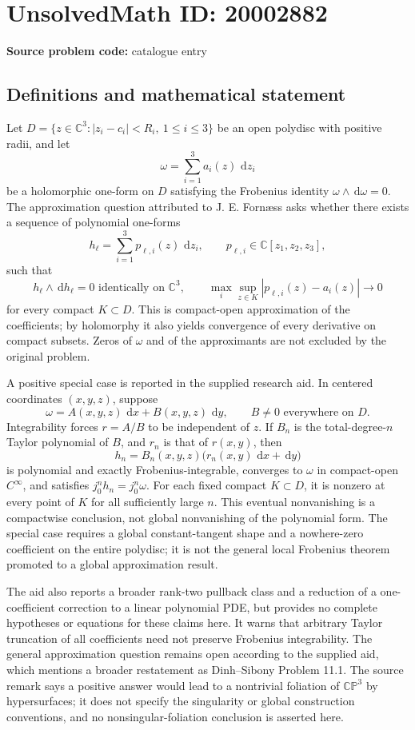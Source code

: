 \documentclass[11pt]{article}
\newcommand{\C}{\mathbb{C}}
\newcommand{\PP}{\mathbb{P}}
\newcommand{\dd}{\,\mathrm{d}}
\begin{document}
\section*{UnsolvedMath ID: 20002882}
\textbf{Source problem code:} catalogue entry
\subsection{Definitions and mathematical statement}
Let \(D=\{z\in\C^3:|z_i-c_i|<R_i,\ 1\le i\le3\}\) be an open polydisc with positive radii, and let
\[
\omega=\sum_{i=1}^3 a_i(z)\,\dd z_i
\]
be a holomorphic one-form on \(D\) satisfying the Frobenius identity \(\omega\wedge\dd\omega=0\). The approximation question attributed to J. E. Forn\ae ss asks whether there exists a sequence of polynomial one-forms
\[
h_\ell=\sum_{i=1}^3 p_{\ell,i}(z)\,\dd z_i,\qquad p_{\ell,i}\in\C[z_1,z_2,z_3],
\]
such that
\[
h_\ell\wedge\dd h_\ell=0\text{ identically on }\C^3,
\qquad
\max_i\sup_{z\in K}|p_{\ell,i}(z)-a_i(z)|\longrightarrow0
\]
for every compact \(K\subset D\). This is compact-open approximation of the coefficients; by holomorphy it also yields convergence of every derivative on compact subsets. Zeros of \(\omega\) and of the approximants are not excluded by the original problem.

A positive special case is reported in the supplied research aid. In centered coordinates \((x,y,z)\), suppose
\[
\omega=A(x,y,z)\,\dd x+B(x,y,z)\,\dd y,\qquad B\ne0\text{ everywhere on }D.
\]
Integrability forces \(r=A/B\) to be independent of \(z\). If \(B_n\) is the total-degree-\(n\) Taylor polynomial of \(B\), and \(r_n\) is that of \(r(x,y)\), then
\[
h_n=B_n(x,y,z)\bigl(r_n(x,y)\,\dd x+\dd y\bigr)
\]
is polynomial and exactly Frobenius-integrable, converges to \(\omega\) in compact-open \(C^\infty\), and satisfies \(j_0^nh_n=j_0^n\omega\). For each fixed compact \(K\subset D\), it is nonzero at every point of \(K\) for all sufficiently large \(n\). This eventual nonvanishing is a compactwise conclusion, not global nonvanishing of the polynomial form. The special case requires a global constant-tangent shape and a nowhere-zero coefficient on the entire polydisc; it is not the general local Frobenius theorem promoted to a global approximation result.

The aid also reports a broader rank-two pullback class and a reduction of a one-coefficient correction to a linear polynomial PDE, but provides no complete hypotheses or equations for these claims here. It warns that arbitrary Taylor truncation of all coefficients need not preserve Frobenius integrability. The general approximation question remains open according to the supplied aid, which mentions a broader restatement as Dinh--Sibony Problem 11.1. The source remark says a positive answer would lead to a nontrivial foliation of \(\C\PP^3\) by hypersurfaces; it does not specify the singularity or global construction conventions, and no nonsingular-foliation conclusion is asserted here.
\end{document}
